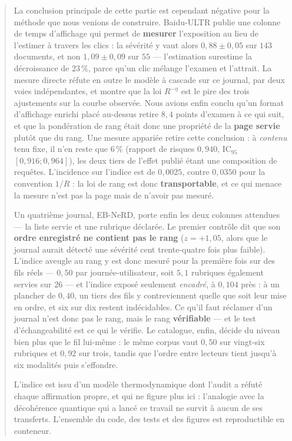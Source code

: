 \documentclass[11pt,a4paper]{article}
\begin{document}
\begin{abstract}
La conclusion principale de cette partie est cependant négative pour la méthode que nous venions
de construire. Baidu-ULTR publie une colonne de temps d'affichage qui permet de \textbf{mesurer}
l'exposition au lieu de l'estimer à travers les clics : la sévérité y vaut alors
$0{,}88 \pm 0{,}05$ sur $143$ documents, et non $1{,}09 \pm 0{,}09$ sur $55$ --- l'estimation
surestime la décroissance de $23\,\%$, parce qu'un clic mélange l'examen et l'attrait. La mesure
directe réfute en outre le modèle à cascade sur ce journal, par deux voies indépendantes, et
montre que la loi $R^{-\eta}$ est le pire des trois ajustements sur la courbe observée. Nous avions enfin conclu
qu'un format d'affichage enrichi placé au-dessus retire $8{,}4$ points d'examen à ce qui suit, et
que la pondération de rang était donc une propriété de la \textbf{page servie} plutôt que du rang.
Une mesure appariée retire cette conclusion : à \emph{contenu} tenu fixe, il n'en reste que $6\,\%$
(rapport de risques $0{,}940$, IC$_{95}$ $[0{,}916 ; 0{,}964]$), les deux tiers de l'effet publié
étant une composition de requêtes. L'incidence sur l'indice est de $0{,}0025$, contre $0{,}0350$
pour la convention $1/R$ : la loi de rang est donc \textbf{transportable}, et ce qui menace la
mesure n'est pas la page mais de n'avoir pas mesuré.

Un quatrième journal, EB-NeRD, porte enfin les deux colonnes attendues --- la liste servie et
une rubrique déclarée. Le premier contrôle dit que son \textbf{ordre enregistré ne contient pas
le rang} ($z = +1{,}05$, alors que le journal aurait détecté une sévérité cent trente-quatre fois
plus faible). L'indice aveugle au rang y est donc mesuré pour la première fois sur des fils réels
--- $0{,}50$ par journée-utilisateur, soit $5{,}1$ rubriques également servies sur $26$ --- et
l'indice exposé seulement \emph{encadré}, à $0{,}104$ près : à un plancher de $0{,}40$, un tiers
des fils y contreviennent quelle que soit leur mise en ordre, et six sur dix restent indécidables.
Ce qu'il faut réclamer d'un journal n'est donc pas le rang, mais le rang \textbf{vérifiable} ---
et le test d'échangeabilité est ce qui le vérifie. Le catalogue, enfin, décide du niveau bien plus
que le fil lui-même : le même corpus vaut $0{,}50$ sur vingt-six rubriques et $0{,}92$ sur trois,
tandis que l'ordre entre lecteurs tient jusqu'à six modalités puis s'effondre.

L'indice est issu d'un modèle thermodynamique dont l'audit a réfuté chaque affirmation
propre, et qui ne figure plus ici : l'analogie avec la décohérence
quantique qui a lancé ce travail ne survit à aucun de ses transferts. L'ensemble du code,
des tests et des figures est reproductible en conteneur.
\end{abstract}
\end{document}

